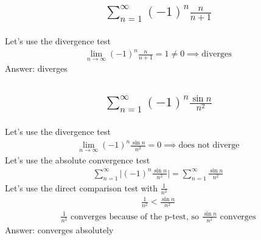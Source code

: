 \documentclass{article}
\begin{document}
\subsection{
	\begin{align*}
		\sum_{n = 1}^{\infty} (-1)^n \frac{n}{n + 1}
	\end{align*}
}
Let's use the divergence test
\begin{align*}
	\lim_{n \to \infty} {(-1)^n \frac{n}{n + 1}} = 1 \neq 0 \implies \text{diverges}
\end{align*}
Answer: diverges

\subsection{
	\begin{align*}
		\sum_{n = 1}^{\infty} (-1)^n \frac{\sin{n}}{n^2}
	\end{align*}
}
Let's use the divergence test
\begin{align*}
	\lim_{n \to \infty} {(-1)^n \frac{\sin{n}}{n^2}} = 0 \implies \text{does not diverge}
\end{align*}
Let's use the absolute convergence test
\begin{align*}
	\sum_{n = 1}^{\infty} \bigg| (-1)^n \frac{\sin{n}}{n^2} \bigg| = \sum_{n = 1}^{\infty}  \frac{\sin{n}}{n^2}
\end{align*}
Let's use the direct comparison test with $\frac{1}{n^2}$
\begin{align*}
	\frac{1}{n^2} < \frac{\sin{n}}{n^2}
\end{align*}
\begin{align*}
	\frac{1}{n^2} \text{ converges because of the p-test, so } \frac{\sin{n}}{n^2} \text{ converges}
\end{align*}
Answer: converges absolutely

\end{document}

